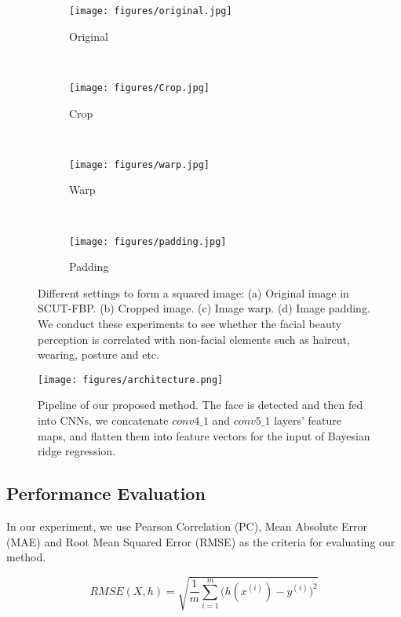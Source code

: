\documentclass[a4paper,conference]{IEEEtran}
\begin{document}
    \begin{figure}
      \centering
      \begin{subfigure}[b]{0.1\textwidth}
          \texttt{[image: figures/original.jpg]}
          \caption{Original}
          \label{fig:original}
      \end{subfigure}
      ~
      \begin{subfigure}[b]{0.1\textwidth}
          \texttt{[image: figures/Crop.jpg]}
          \caption{Crop}
          \label{fig:crop}
      \end{subfigure}
      ~
      \begin{subfigure}[b]{0.1\textwidth}
          \texttt{[image: figures/warp.jpg]}
          \caption{Warp}
          \label{fig:warp}
      \end{subfigure}
      ~
      \begin{subfigure}[b]{0.1\textwidth}
          \texttt{[image: figures/padding.jpg]}
          \caption{Padding}
          \label{fig:padding}
      \end{subfigure}
      \caption{Different settings to form a squared image:
        (a) Original image in SCUT-FBP.
        (b) Cropped image.
        (c) Image warp.
        (d) Image padding.
        We conduct these experiments to see whether the facial beauty perception
        is correlated with non-facial elements such as haircut, wearing, posture
        and etc.
      }
      \label{warp_and_padding}
    \end{figure}

    \begin{figure}[htb]
      \centering
      \texttt{[image: figures/architecture.png]}
      \caption{Pipeline of our proposed method. The face is detected and
        then fed into CNNs, we concatenate $conv4\_1$ and $conv5\_1$ layers'
        feature maps, and flatten them into feature vectors for the input of Bayesian
        ridge regression.}
      \label{pipeline}
    \end{figure}


  \subsection{Performance Evaluation}
    In our experiment, we use Pearson Correlation (PC),
    Mean Absolute Error (MAE) and Root Mean Squared Error (RMSE) as
    the criteria for evaluating our method.

    \begin{equation}
      RMSE(X,h)=\sqrt{\frac{1}{m}\sum_{i=1}^m\big(h(x^{(i)})-y^{(i)})^2}
    \end{equation}
\end{document}
